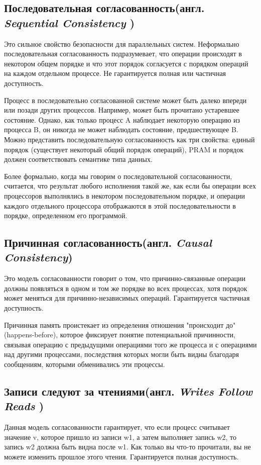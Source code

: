 \documentclass[12pt,  openany]{book}
\begin{document}
\subsection{Последовательная согласованность(англ.  \textit{Sequential Consistency })}
Это сильное свойство безопасности для параллельных систем. Неформально последовательная согласованность подразумевает, что операции происходят в некотором общем порядке и что этот порядок согласуется с порядком операций на каждом отдельном процессе.
Не гарантируется полная или частичная доступность.
\par
Процесс в последовательно согласованной системе может быть далеко впереди или позади других процессов. Например, может быть прочитано устаревшее состояние. Однако, как только процесс A наблюдает некоторую операцию из процесса B, он никогда не может наблюдать состояние, предшествующее B.
Можно представить последовательную согласованность как три свойства: единый порядок (существует некоторый общий порядок операций), PRAM и порядок должен соответствовать семантике типа данных.
\par
Более формально, когда мы говорим о последовательной согласованности, считается, что результат любого исполнения такой же, как если бы операции всех процессоров выполнялись в некотором последовательном порядке, и операции каждого отдельного процессора отображаются в этой последовательности в порядке, определенном его программой.

\subsection{Причинная согласованность(англ.  \textit{Causal Consistency})}
Это модель согласованности говорит о том, что причинно-связанные операции должны появляться в одном и том же порядке во всех процессах, хотя порядок может меняться для причинно-независимых операций.
Гарантируется частичная доступность.
\par
Причинная память проистекает из определения отношения "происходит до"(happens-before), которое фиксирует понятие потенциальной причинности, связывая операцию с предыдущими операциями того же процесса и с операциями над другими процессами, последствия которых могли быть видны благодаря сообщениям, которыми обменивались эти процессы.

\subsection{Записи следуют за чтениями(англ.  \textit{Writes Follow Reads })}
Данная модель согласованности гарантирует, что если процесс считывает значение v, которое пришло из записи w1, а затем выполняет запись w2, то запись w2 должна быть видна после w1. Как только вы что-то прочитали, вы не можете изменить прошлое этого чтения. Гарантируется полная доступность.
\end{document}
